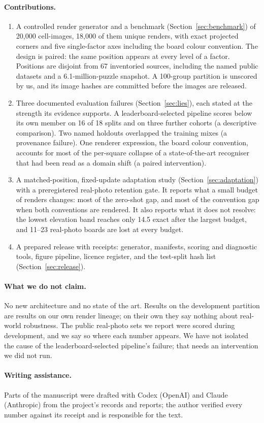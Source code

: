 \paragraph{Contributions.}
\begin{enumerate}
  \item A controlled render generator and a benchmark (Section~\ref{sec:benchmark}) of 20{,}000
    cell-images, 18{,}000 of them unique renders, with exact projected corners and five
    single-factor axes including the board colour convention. The design is paired: the same
    position appears at every level of a factor. Positions are disjoint from 67 inventoried
    sources, including the named public datasets and a 6.1-million-puzzle snapshot. A
    100-group partition is unscored by us, and its image hashes are committed before the
    images are released.
  \item Three documented evaluation failures (Section~\ref{sec:lies}), each stated at the strength
    its evidence supports. A leaderboard-selected pipeline scores below its own member on 16 of 18
    splits and on three further cohorts (a descriptive comparison). Two named holdouts overlapped the
    training mixes (a provenance failure). One renderer expression, the board colour convention,
    accounts for most of the per-square collapse of a state-of-the-art recogniser that had been
    read as a domain shift (a paired intervention).
  \item A matched-position, fixed-update adaptation study (Section~\ref{sec:adaptation}) with a
    preregistered real-photo retention gate. It reports what a small budget of renders changes:
    most of the zero-shot gap, and most of the convention gap when both conventions are rendered. It
    also reports what it does not resolve: the lowest elevation band reaches only 14.5 exact after
    the largest budget, and 11--23 real-photo boards are lost at every budget.
  \item A prepared release with receipts: generator, manifests, scoring and diagnostic tools, figure
    pipeline, licence register, and the test-split hash list (Section~\ref{sec:release}).
\end{enumerate}

\paragraph{What we do not claim.} No new architecture and no state of the art. Results on the
development partition are results on our own render lineage; on their own they say nothing about
real-world robustness. The public real-photo sets we report were scored during development, and we
say so where each number appears. We have not isolated the cause of the leaderboard-selected
pipeline's failure; that needs an intervention we did not run.

\paragraph{Writing assistance.} Parts of the manuscript were drafted with Codex (OpenAI) and Claude
(Anthropic) from the project's records and reports; the author verified every number against its
receipt and is responsible for the text.
